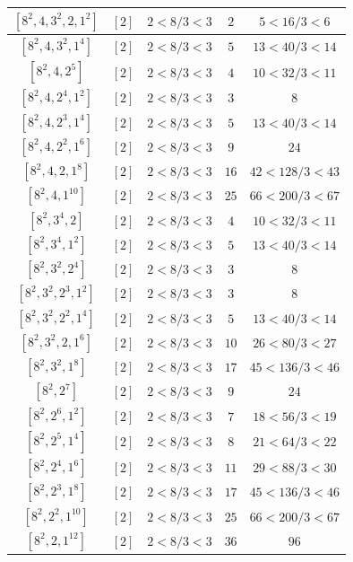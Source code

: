 \documentclass{article}%
\begin{document}
\begin{center}
\begin{longtable}{||c|c|c|c|c||}
$[8^{2}, 4, 3^{2}, 2, 1^{2}]$ & $[2]$ & $2 < 8/3 < 3$ & $2$ & $5 < 16/3 < 6$ \\ \hline 
$[8^{2}, 4, 3^{2}, 1^{4}]$ & $[2]$ & $2 < 8/3 < 3$ & $5$ & $13 < 40/3 < 14$ \\ \hline 
$[8^{2}, 4, 2^{5}]$ & $[2]$ & $2 < 8/3 < 3$ & $4$ & $10 < 32/3 < 11$ \\ \hline 
$[8^{2}, 4, 2^{4}, 1^{2}]$ & $[2]$ & $2 < 8/3 < 3$ & $3$ & $8$ \\ \hline 
$[8^{2}, 4, 2^{3}, 1^{4}]$ & $[2]$ & $2 < 8/3 < 3$ & $5$ & $13 < 40/3 < 14$ \\ \hline 
$[8^{2}, 4, 2^{2}, 1^{6}]$ & $[2]$ & $2 < 8/3 < 3$ & $9$ & $24$ \\ \hline 
$[8^{2}, 4, 2, 1^{8}]$ & $[2]$ & $2 < 8/3 < 3$ & $16$ & $42 < 128/3 < 43$ \\ \hline 
$[8^{2}, 4, 1^{10}]$ & $[2]$ & $2 < 8/3 < 3$ & $25$ & $66 < 200/3 < 67$ \\ \hline 
$[8^{2}, 3^{4}, 2]$ & $[2]$ & $2 < 8/3 < 3$ & $4$ & $10 < 32/3 < 11$ \\ \hline 
$[8^{2}, 3^{4}, 1^{2}]$ & $[2]$ & $2 < 8/3 < 3$ & $5$ & $13 < 40/3 < 14$ \\ \hline 
$[8^{2}, 3^{2}, 2^{4}]$ & $[2]$ & $2 < 8/3 < 3$ & $3$ & $8$ \\ \hline 
$[8^{2}, 3^{2}, 2^{3}, 1^{2}]$ & $[2]$ & $2 < 8/3 < 3$ & $3$ & $8$ \\ \hline 
$[8^{2}, 3^{2}, 2^{2}, 1^{4}]$ & $[2]$ & $2 < 8/3 < 3$ & $5$ & $13 < 40/3 < 14$ \\ \hline 
$[8^{2}, 3^{2}, 2, 1^{6}]$ & $[2]$ & $2 < 8/3 < 3$ & $10$ & $26 < 80/3 < 27$ \\ \hline 
$[8^{2}, 3^{2}, 1^{8}]$ & $[2]$ & $2 < 8/3 < 3$ & $17$ & $45 < 136/3 < 46$ \\ \hline 
$[8^{2}, 2^{7}]$ & $[2]$ & $2 < 8/3 < 3$ & $9$ & $24$ \\ \hline 
$[8^{2}, 2^{6}, 1^{2}]$ & $[2]$ & $2 < 8/3 < 3$ & $7$ & $18 < 56/3 < 19$ \\ \hline 
$[8^{2}, 2^{5}, 1^{4}]$ & $[2]$ & $2 < 8/3 < 3$ & $8$ & $21 < 64/3 < 22$ \\ \hline 
$[8^{2}, 2^{4}, 1^{6}]$ & $[2]$ & $2 < 8/3 < 3$ & $11$ & $29 < 88/3 < 30$ \\ \hline 
$[8^{2}, 2^{3}, 1^{8}]$ & $[2]$ & $2 < 8/3 < 3$ & $17$ & $45 < 136/3 < 46$ \\ \hline 
$[8^{2}, 2^{2}, 1^{10}]$ & $[2]$ & $2 < 8/3 < 3$ & $25$ & $66 < 200/3 < 67$ \\ \hline 
$[8^{2}, 2, 1^{12}]$ & $[2]$ & $2 < 8/3 < 3$ & $36$ & $96$ \\ \hline 

\end{longtable}
\end{center}
\end{document}
